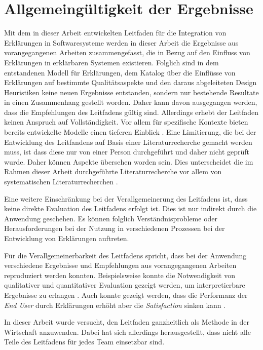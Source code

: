 \section{Allgemeingültigkeit der Ergebnisse}

Mit dem in dieser Arbeit entwickelten Leitfaden für die Integration von Erklärungen in Softwaresysteme werden in dieser Arbeit die Ergebnisse aus vorangegangenen Arbeiten zusammengefasst, die in Bezug auf den Einfluss von Erklärungen in erklärbaren Systemen existieren. Folglich sind in dem entstandenen Modell für Erklärungen, dem Katalog über die Einflüsse von Erklärungen auf bestimmte Qualitätsaspekte und den daraus abgeleiteten Design Heuristiken keine neuen Ergebnisse entstanden, sondern nur bestehende Resultate in einen Zusammenhang gestellt worden. Daher kann davon ausgegangen werden, dass die Empfehlungen des Leitfadens gültig sind. Allerdings erhebt der Leitfaden keinen Anspruch auf Vollständigkeit. Vor allem für spezifische Kontexte bieten bereits entwickelte Modelle einen tieferen Einblick \cite{nunes_systematic_2017, sokol_explainability_2020}. Eine Limitierung, die bei der Entwicklung des Leitfandens auf Basis einer Literaturrecherche gemacht werden muss, ist dass diese nur von einer Person durchgeführt und daher nicht geprüft wurde. Daher können Aspekte übersehen worden sein. Dies unterscheidet die im Rahmen dieser Arbeit durchgeführte Literaturrecherche vor allem von systematischen Literaturrecherchen \cite[vgl.][]{nunes_systematic_2017,chazette_knowledge_nodate}.

Eine weitere Einschränkung bei der Verallgemeinerung des Leitfadens ist, dass keine direkte Evaluation des Leitfadens erfolgt ist. Dies ist nur indirekt durch die Anwendung geschehen. Es können folglich Verständnisprobleme oder Herausforderungen bei der Nutzung in verschiedenen Prozessen bei der Entwicklung von Erklärungen auftreten.

Für die Verallgemeinerbarkeit des Leitfadens spricht, dass bei der Anwendung verschiedene Ergebnisse und Empfehlungen aus vorangegangenen Arbeiten reproduziert werden konnten. Beispielsweise konnte die Notwendigkeit von qualitativer und quantitativer Evaluation gezeigt werden, um interpretierbare Ergebnisse zu erlangen \cite{}. Auch konnte gezeigt werden, dass die Performanz der \textit{End User} durch Erklärungen erhöht aber die \textit{Satisfaction} sinken kann \cite{}. 

\smallskip

In dieser Arbeit wurde versucht, den Leitfaden ganzheitlich als Methode in der Wirtschaft anzuwenden. Dabei hat sich allerdings herausgestellt, dass nicht alle Teile des Leitfadens für jedes Team einsetzbar sind.

